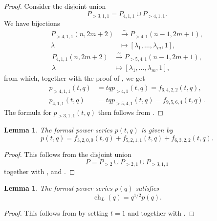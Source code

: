\documentclass[a4paper, 12pt, reqno]{amsart}
\newtheorem{lemma}[theorem]{Lemma}
\theoremstyle{remark}
\numberwithin{equation}{subsection}
\DeclareMathOperator{\ch}{ch}
\begin{document}
\begin{proof}
  Consider the disjoint union
  \begin{equation*}
    P_{>3, 1, 1} = P_{4, 1, 1} \cup P_{>4, 1, 1}.
  \end{equation*}
  We have bijections
  \begin{align*}
    P_{>4, 1, 1}(n, 2m + 2) &\xrightarrow{\sim} P_{>4, 1}(n - 1, 2m + 1), \\
    \lambda &\mapsto [\lambda_1, \dots, \lambda_m, 1],
  \end{align*}
  \begin{align*}
    P_{4, 1, 1}(n, 2m + 2) &\xrightarrow{\sim} P_{>5, 4, 1}(n - 1, 2m + 1), \\
    \lambda &\mapsto [\lambda_1, \dots, \lambda_m, 1],
  \end{align*}
  from which, together with the proof of , we get
  \begin{align*}
    p_{>4, 1, 1}(t, q) &= tqp_{>4, 1}(t, q) = f_{6, 4, 2, 2}(t, q), \\
    p_{4, 1, 1}(t, q) &= tqp_{>5, 4, 1}(t, q) = f_{9, 5, 6, 4}(t, q).
  \end{align*}
  The formula for $p_{>3, 1, 1}(t, q)$ then follows from .
\end{proof}

\begin{lemma}
  \label{lmm:24}
  The formal power series $p(t, q)$ is given by
  \begin{equation*}
    p(t, q) = f_{3, 2, 0, 0}(t, q) + f_{5, 2, 1, 1}(t, q) + f_{6, 3, 2, 2}(t, q).
  \end{equation*}
\end{lemma}

\begin{proof}
  This follows from the disjoint union
  \begin{equation*}
    P = P_{>2} \cup P_{>2, 1} \cup P_{>3, 1, 1}
  \end{equation*}
  together with ,  and .
\end{proof}

\begin{lemma}
  \label{lmm:25}
  The formal power series $p(q)$ satisfies
  \begin{equation*}
    \ch_{L}(q) = q^{1/2}p(q).
  \end{equation*}
\end{lemma}

\begin{proof}
  This follows from  by setting $t = 1$ and \cite[Theorem 4]{andrews_singular_2022} together with .
\end{proof}
\end{document}
